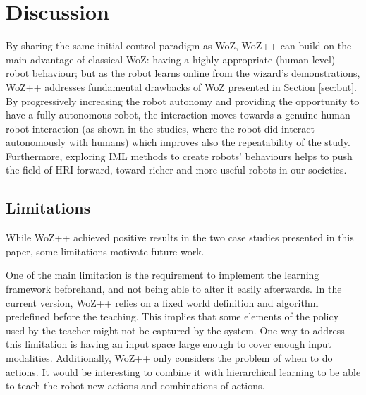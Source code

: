 \documentclass[manuscript, review, anonymous]{acmart}
\newcommand{\ES}[1]{\added[id=ES]{#1}}
\newcommand{\SL}[1]{\added[id=SL]{#1}}
\newcommand{\woz}{WoZ++\xspace}
\begin{document}
\section{Discussion}

By sharing the same initial control paradigm as WoZ, \woz can build on the main
advantage of classical WoZ: having a highly appropriate (human-level) robot
behaviour; but as the robot learns online from the wizard's demonstrations, \woz
addresses fundamental drawbacks of WoZ presented in Section \ref{sec:but}. By
progressively increasing the robot autonomy and providing the opportunity to
have a fully autonomous robot, the interaction moves towards a genuine
human-robot interaction (as shown in the studies, where the robot did interact
autonomously with humans) which improves also the repeatability of the study.
Furthermore, exploring IML methods to create robots' behaviours helps to push
the field of HRI forward, toward richer and more useful robots in our societies.



\subsection{Limitations}

While \woz achieved positive results in the two case studies presented in this paper, 
some limitations motivate future work.

One of the main limitation is the requirement to implement the learning framework
beforehand, and not being able to alter it easily afterwards. In the current version,
\woz relies on a fixed world definition and algorithm predefined before the teaching.
This implies that some elements of the policy used by the teacher might not be captured
by the system. One way to address this limitation is having an input space large enough to 
cover enough input modalities. Additionally, \woz only considers the problem of when to do actions.
It would be interesting to combine it with hierarchical learning to be able to teach the
robot new actions and combinations of actions.
\end{document}
